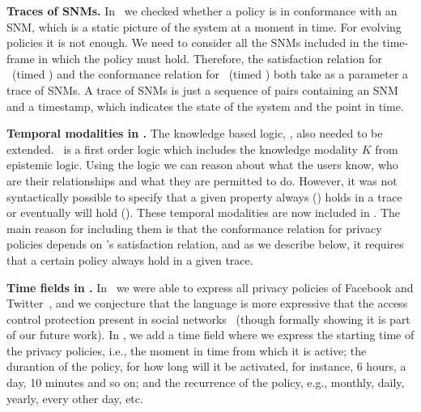 \begin{inparaenum}[]
\item \textbf{Traces of SNMs.} In \fppf~we checked whether a policy is in conformance with an SNM, which is a static picture of the system at a moment in time. For evolving policies it is not enough. We need to consider all the SNMs included in the time-frame in which the policy must hold. Therefore, the satisfaction relation for \tkbl~(timed \kbl) and the conformance relation for \tppl~(timed \ppl) both take as a parameter a trace of SNMs. A trace of SNMs is just a sequence of pairs containing an SNM and a timestamp, which indicates the state of the system and the point in time.
  
\item \textbf{Temporal modalities in \tkbl.} The knowledge based logic, \kbl, also needed to be extended. \kbl~is a first order logic which includes the knowledge modality $K$ from epistemic logic. Using the logic we can reason about what the users know, who are their relationships and what they are permitted to do. However, it was not syntactically possible to specify that a given property always (\al) holds in a trace or eventually will hold (\ev). These temporal modalities are now included in \tkbl. The main reason for including them is that the conformance relation for privacy policies depends on \tkbl's satisfaction relation, and as we describe below, it requires that a certain policy always hold in a given trace.
  
\item \textbf{Time fields in \tppl.} In \ppl~we were able to express all privacy policies of Facebook and Twitter~\cite{PS14fpp}, and we conjecture that the language is more expressive that the access control protection present in social networks~\cite{BFS+12rbaceehl,F11rbacppl} (though formally showing it is part of our future work). In \tppl, we add a time field where we express the starting time of the privacy policies, i.e., the moment in time from which it is active; the durantion of the policy, for how long will it be activated, for instance, 6 hours, a day, 10 minutes and so on; and the recurrence of the policy, e.g., monthly, daily, yearly, every other day, etc.

\end{inparaenum}

